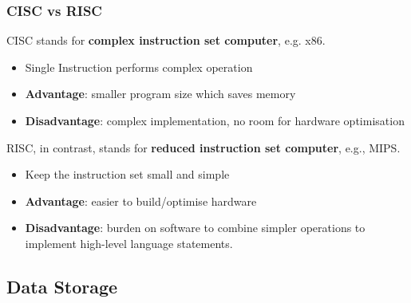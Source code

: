 \documentclass[12pt]{article}
\theoremstyle{definition}
\begin{document}
\subsubsection{CISC vs RISC}
CISC stands for \textbf{complex instruction set computer}, e.g. x86.
\begin{itemize}
  \item Single Instruction performs complex operation
  \item \textbf{Advantage}: smaller program size which saves memory
  \item \textbf{Disadvantage}: complex implementation, no room for hardware optimisation
\end{itemize}
RISC, in contrast, stands for \textbf{reduced instruction set computer}, e.g., MIPS.
\begin{itemize}
  \item Keep the instruction set small and simple
  \item \textbf{Advantage}: easier to build/optimise hardware
  \item \textbf{Disadvantage}: burden on software to combine simpler operations to implement high-level language statements.
\end{itemize}
\subsection{Data Storage}
\end{document}
